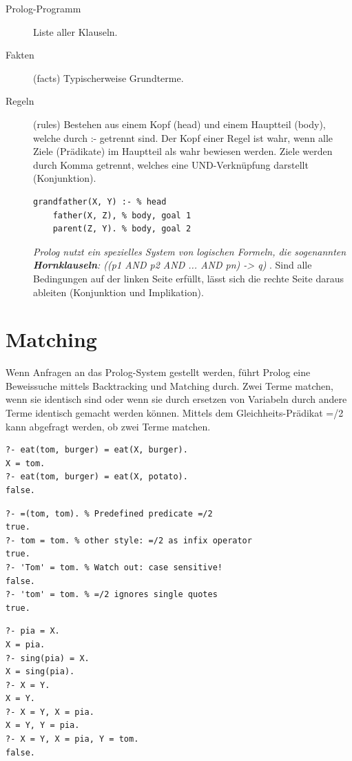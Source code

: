 \begin{description}
	\item[Prolog-Programm] Liste aller Klauseln.
	
	\item[Fakten] (facts) Typischerweise Grundterme.
	
	\item[Regeln] (rules) Bestehen aus einem Kopf (head) und einem Hauptteil (body), welche durch :- getrennt sind. Der Kopf einer Regel ist wahr, wenn alle Ziele (Prädikate) im Hauptteil als wahr bewiesen werden. Ziele werden durch Komma getrennt, welches eine UND-Verknüpfung darstellt (Konjunktion).
	
	\begin{lstlisting}[caption=Regel]
	grandfather(X, Y) :- % head
	father(X, Z), % body, goal 1
	parent(Z, Y). % body, goal 2
	\end{lstlisting}
	
	\emph{Prolog nutzt ein spezielles System von logischen Formeln, die sogenannten \textbf{Hornklauseln}: ((p1 AND p2 AND ... AND pn) -> q) }. Sind alle Bedingungen auf der linken Seite erfüllt, lässt sich die rechte Seite daraus ableiten (Konjunktion und Implikation).
\end{description}

\section{Matching}
Wenn Anfragen an das Prolog-System gestellt werden, führt Prolog eine Beweissuche mittels Backtracking und Matching durch. Zwei Terme matchen, wenn sie identisch sind oder wenn sie durch ersetzen von Variabeln durch andere Terme identisch gemacht werden können. Mittels dem Gleichheits-Prädikat =/2 kann abgefragt werden, ob zwei Terme matchen.

\begin{lstlisting}[caption=Gleichheits-Prädikat]
?- eat(tom, burger) = eat(X, burger).
X = tom.
?- eat(tom, burger) = eat(X, potato).
false.
\end{lstlisting}

\begin{lstlisting}[caption=Gleichheits-Prädikat auf Atomen]
% Atome matchen, wenn sie genau gleich sind.
?- =(tom, tom). % Predefined predicate =/2
true.
?- tom = tom. % other style: =/2 as infix operator
true.
?- 'Tom' = tom. % Watch out: case sensitive!
false.
?- 'tom' = tom. % =/2 ignores single quotes
true.
\end{lstlisting}

\begin{lstlisting}[caption=Gleichheits-Prädikat auf Variabeln und Termen]
% Falls ein Term eine Variable ist, dann matchen beide Terme und die Variable wird dem Wert des zweiten Terms instanziiert.
?- pia = X.
X = pia.
?- sing(pia) = X.
X = sing(pia).
?- X = Y.
X = Y.
?- X = Y, X = pia.
X = Y, Y = pia.
?- X = Y, X = pia, Y = tom.
false.
\end{lstlisting}

